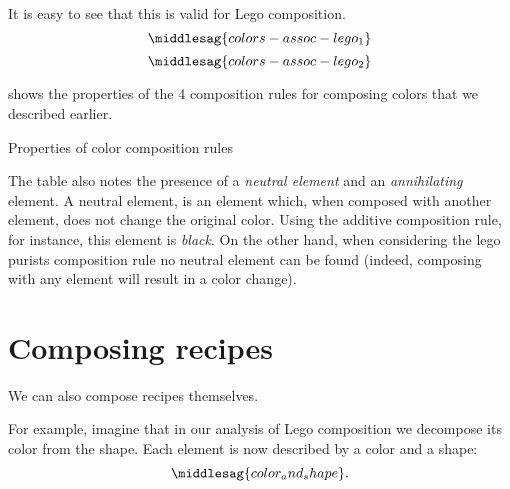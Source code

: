 It is easy to see that this is valid for Lego composition.
\begin{equation}
    \label{eq:colors-assoc-legoa}
    \middlesag{colors-assoc-lego_1}
\end{equation}
\begin{equation}
    \label{eq:colors-assoc-legob}
    \middlesag{colors-assoc-lego_2}
\end{equation}

 shows the properties of the 4 composition rules for composing colors that we described earlier.

\begin{table*}[p]
    \caption{Properties of color composition rules}
    \label{tab:color-properties}
\end{table*}

The table also notes the presence of a \emph{neutral element} and an \emph{annihilating} element.
A neutral element, is an element which, when composed with another element, does not change the original color.
Using the additive composition rule, for instance, this element is \emph{black}.
On the other hand, when considering the lego purists composition rule no neutral element can be found (indeed, composing with any element will result in a color change).


%

\section{Composing recipes}

We can also compose recipes themselves.

For example, imagine that in our analysis of Lego composition we decompose its color from the shape.
Each element is now described by a color and a shape:
%
\begin{equation}
    \label{eq:color-and-shape}
    \middlesag{color_and_shape}.
\end{equation}


